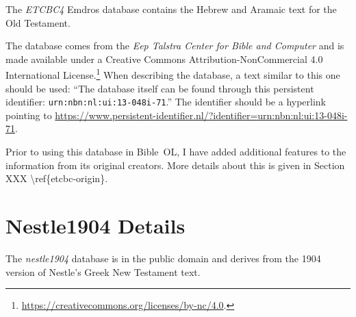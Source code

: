 \documentclass[11pt,oneside,a4paper]{memoir}
\begin{document}
The \emph{ETCBC4} Emdros database contains the Hebrew and Aramaic text for the Old
Testament.

The database comes from the \emph{Eep Talstra Center for Bible and Computer}%
and is made available under a Creative Commons Attribution-NonCommercial 4.0 International
License.\footnote{\url{https://creativecommons.org/licenses/by-nc/4.0}.} When
describing the database, a text similar to this one should be used: ``The database itself can be
found through this persistent identifier: \texttt{urn:nbn:nl:ui:13-048i-71}.'' The identifier should
be a hyperlink pointing to
\url{https://www.persistent-identifier.nl/?identifier=urn:nbn:nl:ui:13-048i-71}.

Prior to using this database in Bible~OL, I have added additional features to the information from
its original creators. More details about this is given in Section XXX \textbackslash{}ref\{etcbc-origin\}.


\chapter{Nestle1904 Details}\label{app-nestle}

The \emph{nestle1904} database is in the public domain and derives from the 1904
version of Nestle's Greek New Testament text.





\printindex
\end{document}
